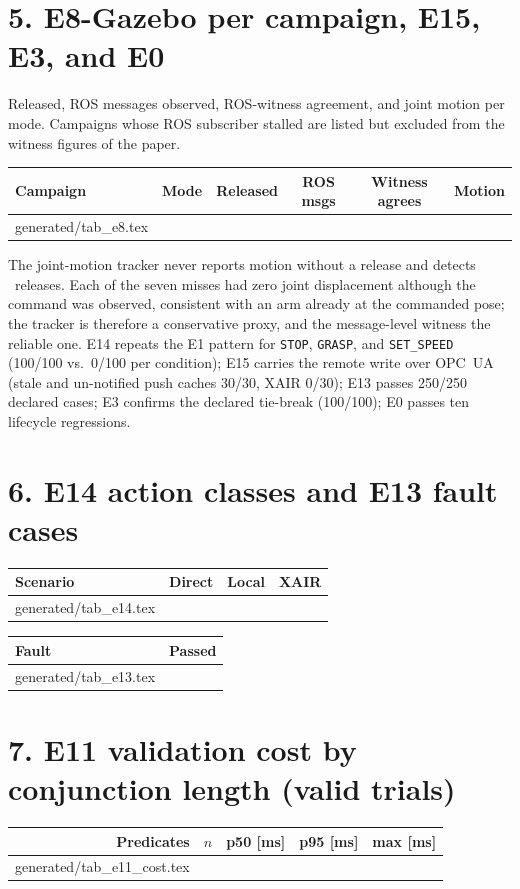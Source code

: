 \documentclass[11pt]{article}
\makeatletter
\newcommand{\gen}[1]{\@@input generated/#1.tex }
\makeatother
\begin{document}
\section*{5. E8-Gazebo per campaign, E15, E3, and E0}
Released, ROS messages observed, ROS-witness agreement, and joint motion per mode. Campaigns whose ROS subscriber stalled are listed but excluded from the witness figures of the paper.
\begin{center}\small
\begin{tabular}{@{}llcccc@{}}
\toprule
\textbf{Campaign} & \textbf{Mode} & \textbf{Released} & \textbf{ROS msgs} & \textbf{Witness agrees} & \textbf{Motion} \\
\midrule
\gen{tab_e8}
\bottomrule
\end{tabular}
\end{center}
\noindent The joint-motion tracker never reports motion without a release and detects \EightMotion\ releases. Each of the seven misses had zero joint displacement although the command was observed, consistent with an arm already at the commanded pose; the tracker is therefore a conservative proxy, and the message-level witness the reliable one. E14 repeats the E1 pattern for \texttt{STOP}, \texttt{GRASP}, and \texttt{SET\_SPEED} (100/100 vs.\ 0/100 per condition); E15 carries the remote write over OPC~UA (stale and un-notified push caches 30/30, XAIR 0/30); E13 passes 250/250 declared cases; E3 confirms the declared tie-break (100/100); E0 passes ten lifecycle regressions.

\section*{6. E14 action classes and E13 fault cases}
\begin{center}\small
\begin{tabular}{@{}lccc@{}}
\toprule
\textbf{Scenario} & \textbf{Direct} & \textbf{Local} & \textbf{XAIR} \\
\midrule
\gen{tab_e14}
\bottomrule
\end{tabular}
\qquad
\begin{tabular}{@{}lc@{}}
\toprule
\textbf{Fault} & \textbf{Passed} \\
\midrule
\gen{tab_e13}
\bottomrule
\end{tabular}
\end{center}

\section*{7. E11 validation cost by conjunction length (valid trials)}
\begin{center}\small
\begin{tabular}{@{}rrrrr@{}}
\toprule
\textbf{Predicates} & \textbf{$n$} & \textbf{p50 [ms]} & \textbf{p95 [ms]} & \textbf{max [ms]} \\
\midrule
\gen{tab_e11_cost}
\bottomrule
\end{tabular}
\end{center}
\end{document}
